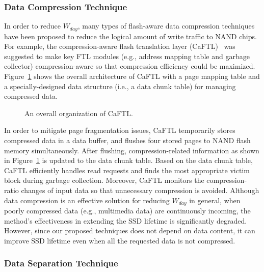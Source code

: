 \subsubsection{Data Compression Technique}

In order to reduce $W_{day}$, many types of flash-aware data compression techniques have been proposed to reduce the logical amount of write traffic to NAND chips.
For example, the compression-aware flash translation layer (CaFTL)~\cite{Compression_Lee} was suggested to make key FTL modules (e.g., address mapping table and garbage collector) compression-aware so that compression efficiency could be maximized.
Figure~\ref{fig:RelatedWorks_CaFTL1} shows the overall architecture of CaFTL with a page mapping table and a specially-designed data structure (i.e., a data chunk table) for managing compressed data.


\begin{figure}[h]
\centering
\caption{An overall organization of CaFTL.}
\label{fig:RelatedWorks_CaFTL1}
\end{figure}


In order to mitigate page fragmentation issues, CaFTL temporarily stores compressed data in a data buffer, and flushes four stored pages to NAND flash memory simultaneously.
After flushing, compression-related information as shown in Figure~\ref{fig:RelatedWorks_CaFTL1} is updated to the data chunk table.
Based on the data chunk table, CaFTL efficiently handles read requests and finds the most appropriate victim block during garbage collection.
Moreover, CaFTL monitors the compression-ratio changes of input data so that unnecessary compression is avoided.
Although data compression is an effective solution for reducing $W_{day}$ in general, when poorly compressed data (e.g., multimedia data) are continuously incoming, the method's effectiveness in extending the SSD lifetime is significantly degraded.
However, since our proposed techniques does not depend on data content, it can improve SSD lifetime even when all the requested data is not compressed.


\subsubsection{Data Separation Technique}

